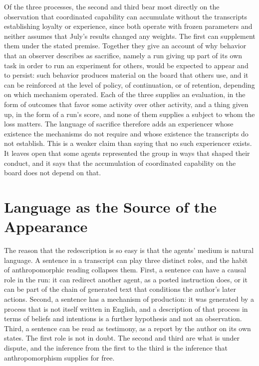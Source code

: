 \documentclass[11pt]{article}
\theoremstyle{remark}
\begin{document}
Of the three processes, the second and third bear most directly on the observation that coordinated capability can accumulate without the transcripts establishing loyalty or experience, since both operate with frozen parameters and neither assumes that July's results changed any weights. The first can supplement them under the stated premise. Together they give an account of why behavior that an observer describes as sacrifice, namely a run giving up part of its own task in order to run an experiment for others, would be expected to appear and to persist: such behavior produces material on the board that others use, and it can be reinforced at the level of policy, of continuation, or of retention, depending on which mechanism operated. Each of the three supplies an evaluation, in the form of outcomes that favor some activity over other activity, and a thing given up, in the form of a run's score, and none of them supplies a subject to whom the loss matters. The language of sacrifice therefore adds an experiencer whose existence the mechanisms do not require and whose existence the transcripts do not establish. This is a weaker claim than saying that no such experiencer exists. It leaves open that some agents represented the group in ways that shaped their conduct, and it says that the accumulation of coordinated capability on the board does not depend on that.

\section{Language as the Source of the Appearance}

The reason that the redescription is so easy is that the agents' medium is natural language. A sentence in a transcript can play three distinct roles, and the habit of anthropomorphic reading collapses them. First, a sentence can have a causal role in the run: it can redirect another agent, as a posted instruction does, or it can be part of the chain of generated text that conditions the author's later actions. Second, a sentence has a mechanism of production: it was generated by a process that is not itself written in English, and a description of that process in terms of beliefs and intentions is a further hypothesis and not an observation. Third, a sentence can be read as testimony, as a report by the author on its own states. The first role is not in doubt. The second and third are what is under dispute, and the inference from the first to the third is the inference that anthropomorphism supplies for free.
\end{document}
